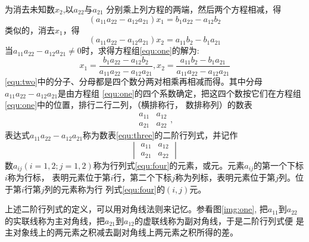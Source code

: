 \documentclass[adobefonts]{ctexbook}
\begin{document}
为消去未知数\begin{math}x_2\end{math},以\begin{math}a_{22}\end{math}与\begin{math}a_{21}\end{math}
分别乘上列方程的两端，然后两个方程相减，得\\
\begin{equation*}
(a_{11}a_{22}-a_{12}a_{21})x_1=b_1a_{22}-a_{12}b_2
\end{equation*}
类似的，消去\begin{math}x_1\end{math}，得
\begin{equation*}
(a_{11}a_{22}-a_{12}a_{21})x_2=a_{11}b_2-b_1a_{21}
\end{equation*}
当$a_{11}a_{22}-a_{12}a_{21}\neq0$时，求得方程组\ref{equ:one}的解为:
\begin{equation}
\label{equ:two}
x_1 = \frac{b_1a_{22}-a_{12}b_2}{a_{11}a_{22}-a_{12}a_{21}},x_2 = \frac{a_{11}b_2-b_1a_{21}}{a_{11}a_{22}-a_{12}a_{21}}
\end{equation}
\ref{equ:two}中的分子、分母都是四个数分两对相乘再相减而得。其中分母$a_{11}a_{22}-a_{12}a_{21}$是由方程组
\ref{equ:one}的四个系数确定，把这四个数按它们在方程组\ref{equ:one}中的位置，排行二行二列，（横排称行，
数排称列）的数表
\begin{equation}
  \label{equ:three}
\begin{array}{ccc}
  a_{11} & a_{12}\\
  a_{21} & a_{22}
\end{array},
\end{equation}
表达式$a_{11}a_{22}-a_{12}a_{21}$称为数表\ref{equ:three}的二阶行列式，并记作
\begin{equation}
  \label{equ:four}
  \begin{vmatrix}
  a_{11} & a_{12}\\
  a_{21} & a_{22}
\end{vmatrix}
\end{equation}
数$a_{ij}(i=1,2;j=1,2)$称为行列式\ref{equ:four}的元素，或元。元素$a_{ij}$的第一个下标$i$称为行标，
表明元素位于第$i$行，第二个下标$j$称为列标，表明元素位于第$j$列。位于第$i$行第$j$列的元素称为行
列式\ref{equ:four}的$(i,j)$元。

上述二阶行列式的定义，可以用对角线法则来记忆。参看图\ref{img:one},
\label{img:one} %
把$a_{11}$到$a_{22}$的实联线称为主对角线，把$a_{21}$到$a_{12}$的虚联线称为副对角线，于是二阶行列式便
是主对象线上的两元素之积减去副对角线上两元素之积所得的差。
\end{document}
